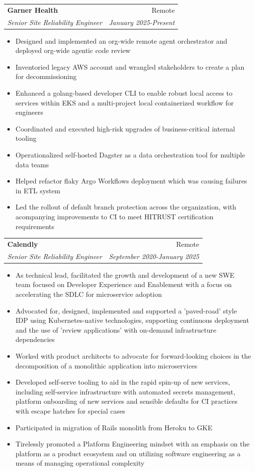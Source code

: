 \documentclass[letterpaper,11pt]{article}
\makeatletter
\newcommand{\resumeItem}[2]{
  \item\small{
    \textbf{#1}{ #2 \vspace{-2pt}}
  }
}
\newcommand{\resumeSubheading}[4]{
  \vspace{-1pt}\item
    \begin{tabular*}{0.97\textwidth}{l@{\extracolsep{\fill}}r}
      \textbf{#1} & #2 \\
      \textit{\small#3} & \textit{\small #4} \\
    \end{tabular*}\vspace{-5pt}
}
\newcommand{\resumeItemListStart}{\begin{itemize}}
\newcommand{\resumeItemListEnd}{\end{itemize}\vspace{-5pt}}
\makeatother
\begin{document}
  \resumeSubheading
      {Garner Health}{Remote}
      {Senior Site Reliability Engineer}{January 2025-Present}
      \resumeItemListStart
        \resumeItem{}
          { Designed and implemented an org-wide remote agent orchestrator and deployed org-wide agentic code review }
        \resumeItem{}
          { Inventoried legacy AWS account and wrangled stakeholders to create a plan for decommissioning }
        \resumeItem{}
          { Enhanced a golang-based developer CLI to enable robust local access to services within EKS and a multi-project local containerized workflow for engineers }
        \resumeItem{}
          { Coordinated and executed high-risk upgrades of business-critical internal tooling }
        \resumeItem{}
          { Operationalized self-hosted Dagster as a data orchestration tool for multiple data teams }
        \resumeItem{}
          { Helped refactor flaky Argo Workflows deployment which was causing failures in ETL system }
        \resumeItem{}
          { Led the rollout of default branch protection across the organization, with acompanying improvements to CI to meet HITRUST certification requirements}
      \resumeItemListEnd

  \resumeSubheading
      {Calendly}{Remote}
      {Senior Site Reliability Engineer}{September 2020-January 2025}
      \resumeItemListStart
        \resumeItem{}
          { As technical lead, facilitated the growth and development of a new SWE team focused on Developer Experience and Enablement with a focus on accelerating the SDLC for microservice adoption}
        \resumeItem{}
          { Advocated for, designed, implemented and supported a 'paved-road' style IDP using Kubernetes-native technologies, supporting continuous deployment and the use of 'review applications' with on-demand infrastructure dependencies}
        \resumeItem{}
          { Worked with product architects to advocate for forward-looking choices in the decomposition of a monolithic application into microservices}
        \resumeItem{}
          { Developed self-serve tooling to aid in the rapid spin-up of new services, including self-service infrastructure with automated secrets management, platform onboarding of new services and sensible defaults for CI practices with escape hatches for special cases }
        \resumeItem{}
          { Participated in migration of Rails monolith from Heroku to GKE }
        \resumeItem{}
          { Tirelessly promoted a Platform Engineering mindset with an emphasis on the platform as a product ecosystem and on utilizing software engineering as a means of managing operational complexity}
      \resumeItemListEnd
\end{document}

